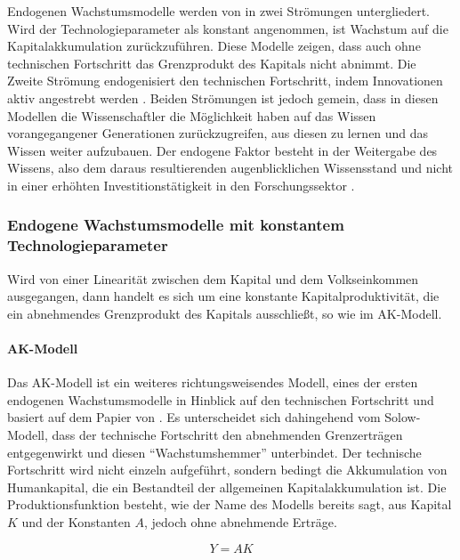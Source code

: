 Endogenen Wachstumsmodelle werden von \citet{Frenkel.1999} in zwei Strömungen untergliedert. Wird der Technologieparameter als konstant angenommen, ist Wachstum auf die Kapitalakkumulation zurückzuführen. Diese Modelle zeigen, dass auch ohne technischen Fortschritt das Grenzprodukt des Kapitals nicht abnimmt. Die Zweite Strömung endogenisiert den technischen Fortschritt, indem Innovationen aktiv angestrebt werden \citep{Frenkel.1999}. Beiden Strömungen ist jedoch gemein, dass in diesen Modellen  die Wissenschaftler die M{\"o}glichkeit haben auf das Wissen vorangegangener Generationen zur{\"u}ckzugreifen, aus diesen zu lernen und das Wissen weiter aufzubauen. Der endogene Faktor besteht in der Weitergabe des Wissens, also dem daraus resultierenden augenblicklichen Wissensstand und nicht in einer erh{\"o}hten Investitionst{\"a}tigkeit in den Forschungssektor \citep{Romer.1990,Rebelo.1991}.
 
\subsubsection{Endogene Wachstumsmodelle mit konstantem Technologieparameter}


Wird von einer Linearität zwischen dem Kapital und dem Volkseinkommen ausgegangen, dann handelt es sich um eine konstante Kapitalproduktivität, die ein abnehmendes Grenzprodukt des Kapitals ausschlie{\ss}t, so wie im AK-Modell. 


\paragraph{AK-Modell}


Das AK-Modell ist ein weiteres richtungsweisendes Modell, eines der er\-sten endogenen Wachstumsmodelle in Hinblick auf den technischen Fortschritt und basiert auf dem Papier von \citet{Rebelo.1991}. Es unterscheidet sich dahingehend vom Solow-Modell, dass der technische Fortschritt den abnehmenden Grenzertr{\"a}gen entgegenwirkt und diesen "`Wachstumshemmer"' unterbindet.  Der technische Fortschritt wird nicht einzeln aufgef{\"u}hrt, sondern bedingt die Akkumulation von Humankapital, die ein Bestandteil der allgemeinen Kapitalakkumulation ist. Die Produktionsfunktion besteht, wie der Name des Modells bereits sagt, aus Kapital $K$ und der Konstanten $A$, jedoch ohne abnehmende Ertr{\"a}ge.

	\begin{equation}
		Y=AK
	\end{equation}

